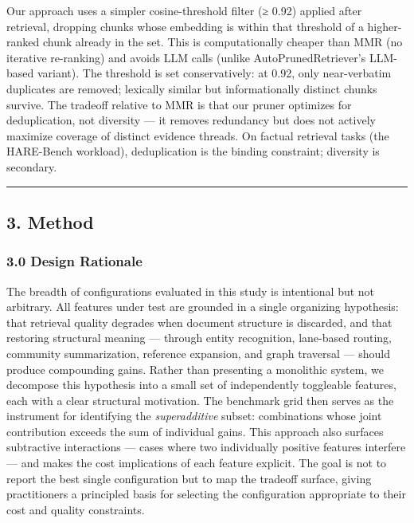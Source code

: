 \documentclass[
]{article}
\begin{document}
Our approach uses a simpler cosine-threshold filter (≥ 0.92) applied
after retrieval, dropping chunks whose embedding is within that
threshold of a higher-ranked chunk already in the set. This is
computationally cheaper than MMR (no iterative re-ranking) and avoids
LLM calls (unlike AutoPrunedRetriever's LLM-based variant). The
threshold is set conservatively: at 0.92, only near-verbatim duplicates
are removed; lexically similar but informationally distinct chunks
survive. The tradeoff relative to MMR is that our pruner optimizes for
deduplication, not diversity --- it removes redundancy but does not
actively maximize coverage of distinct evidence threads. On factual
retrieval tasks (the HARE-Bench workload), deduplication is the binding
constraint; diversity is secondary.

\begin{center}\rule{0.5\linewidth}{0.5pt}\end{center}

\subsection{3. Method}\label{method}

\subsubsection{3.0 Design Rationale}\label{design-rationale}

The breadth of configurations evaluated in this study is intentional but
not arbitrary. All features under test are grounded in a single
organizing hypothesis: that retrieval quality degrades when document
structure is discarded, and that restoring structural meaning ---
through entity recognition, lane-based routing, community summarization,
reference expansion, and graph traversal --- should produce compounding
gains. Rather than presenting a monolithic system, we decompose this
hypothesis into a small set of independently toggleable features, each
with a clear structural motivation. The benchmark grid then serves as
the instrument for identifying the \emph{superadditive} subset:
combinations whose joint contribution exceeds the sum of individual
gains. This approach also surfaces subtractive interactions --- cases
where two individually positive features interfere --- and makes the
cost implications of each feature explicit. The goal is not to report
the best single configuration but to map the tradeoff surface, giving
practitioners a principled basis for selecting the configuration
appropriate to their cost and quality constraints.
\end{document}
